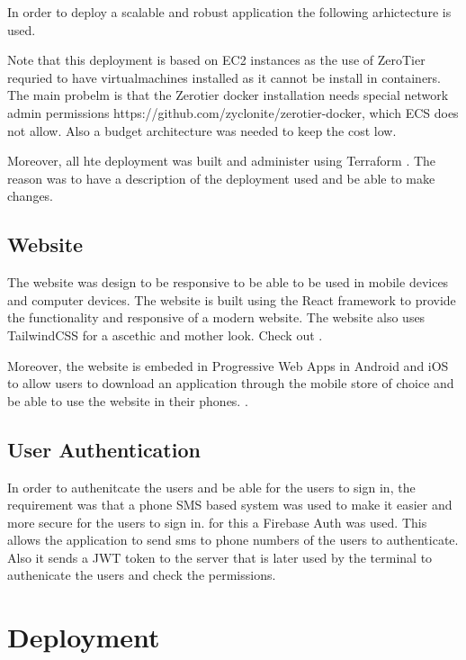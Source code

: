 In order to deploy a scalable and robust application the following arhictecture is used.


Note that this deployment is based on EC2 instances as the use of ZeroTier requried to have virtualmachines installed as it cannot be install in containers. The main probelm is that the Zerotier docker installation needs special network admin permissions https://github.com/zyclonite/zerotier-docker, which ECS  does not allow. Also a budget architecture was needed to keep the cost low.

Moreover, all hte deployment was built and administer using Terraform . The reason was to have a description of the deployment used and be able to make changes.

\subsection{Website}

The website was design to be responsive to be able to be used in mobile devices and computer devices. The website is built using the React framework  to provide the functionality and responsive of a modern website. The website also uses TailwindCSS  for a ascethic and mother look. Check out .

Moreover, the website is embeded in Progressive Web Apps in Android and iOS to allow users to download an application through the mobile store of choice and be able to use the website in their phones. .

\subsection{User Authentication}

In order to authenitcate the users and be able for the users to sign in, the requirement was that a phone SMS based system was used to make it easier and more secure for the users to sign in. for this a Firebase Auth  was used. This allows the application to send sms to phone numbers of the users to authenticate. Also it sends a JWT token to the server that is later used by the terminal to authenicate the users and check the permissions.

\section{Deployment}

